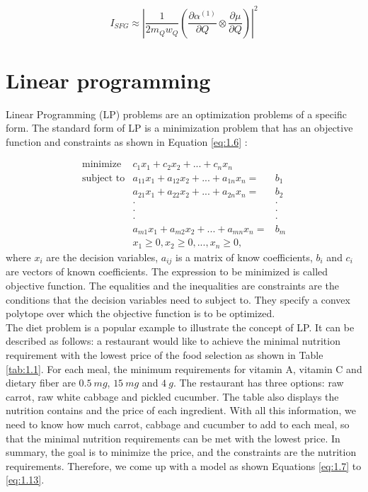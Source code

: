 \begin{equation} \label{eq:1.5}
I_{SFG} \approx \left| \frac{1}{2m_{Q}w_{Q}} \left( \frac{\partial\alpha^{(1)}}{\partial Q} \otimes \frac{\partial\mu}{\partial Q} \right) \right|^{2}
\end{equation}

\section{Linear programming}
Linear Programming (LP) problems are an optimization problems of a specific form. The standard form of LP is a minimization problem that has an objective function and constraints as shown in Equation \ref{eq:1.6} \cite{UULP}:

\begin{eqnarray}  \label{eq:1.6}
 \text{minimize} & c_{1}x_{1} + c_{2}x_{2} + ... + c_{n} x_{n}  \nonumber \\
 \text{subject to} & a_{11} x_{1} + a_{12} x_{2}+ ... + a_{1n} x_{n} = & b_{1} \nonumber \\
& a_{21} x_{1} + a_{22} x_{2} + ... + a_{2n} x_{n} = & b_{2} \nonumber \\
&\cdot                                    &\cdot \nonumber \\
&\cdot                                    &\cdot \nonumber \\
&\cdot                                    &\cdot \nonumber \\
& a_{m1} x_{1} + a_{m2} x_{2} + ... + a_{mn} x_{n} = & b_{m} \nonumber \\
& x_{1} \geq 0, x_{2} \geq 0, ... ,x_{n} \geq 0, 
\end{eqnarray} 
where $x_{i}$ are the decision variables, $a_{ij}$ is a matrix of know coefficients,  $b_{i}$ and $c_{i}$ are vectors of known coefficients. The expression to be minimized is called objective function. The equalities and the inequalities are constraints are the conditions that the decision variables need to subject to. They specify a convex polytope over which the objective function is to be optimized. \\

The diet problem is a popular example to illustrate the concept of LP. It can be described as follows: a restaurant would like to achieve the minimal nutrition requirement with the lowest price of the food selection as shown in Table \ref{tab:1.1}. For each meal, the minimum requirements for vitamin A, vitamin C and dietary fiber are $0.5~mg$, $15~mg$ and $4~g$. The restaurant has three options: raw carrot, raw white cabbage and pickled cucumber. The table also displays the nutrition contains and the price of each ingredient. With all this information, we need to know how much carrot, cabbage and cucumber to add to each meal, so that the minimal nutrition requirements can be met with the lowest price. In summary, the goal is to minimize the price, and the constraints are the nutrition requirements. Therefore, we come up with a model as shown Equations \ref{eq:1.7} to \ref{eq:1.13}.

